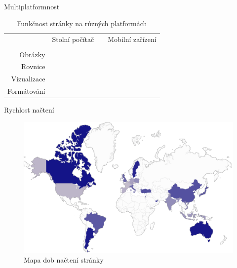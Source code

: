 \documentclass[14pt, hyperref={unicode}]{beamer}
\newcommand{\Firefox}{\faIcon{firefox}}
\newcommand{\Chrome}{\faIcon{chrome}}
\newcommand{\IE}{\faIcon{internet-explorer}}
\newcommand{\Edge}{\faIcon{edge}}
\newcommand{\Safari}{\faIcon{safari}}
\newcommand{\Opera}{\faIcon{opera}}
\newcommand{\Yes}{\faIcon{check}}
\newcommand{\No}{\faIcon{times}}
\newcommand{\NA}{\faIcon{minus}}
\begin{document}
  \begin{frame}{Multiplatformnost}
    \begin{minipage}[b]{\textwidth}
      \begin{table}[H]
        \caption{Funkčnost stránky na různých platformách}
        \scriptsize
        \centering
        \begin{tabular}{@{}rccccccccccccc@{}}
          \toprule
            & \multicolumn{6}{c}{Stolní počítač} & \phantom{abc} & \multicolumn{6}{c}{Mobilní zařízení} \\
          \cmidrule{2-7} \cmidrule{9-14}
            & \Firefox & \Chrome & \IE & \Edge & \Safari & \Opera && \Firefox & \Chrome & \IE & \Edge & \Safari & \Opera \\
          \midrule
            Obrázky     & \Yes & \Yes & \Yes & \Yes & \Yes & \Yes && \Yes & \Yes & \NA & \Yes & \Yes & \Yes \\
            Rovnice     & \Yes & \Yes & \Yes & \Yes & \Yes & \Yes && \Yes & \Yes & \NA & \Yes & \Yes & \Yes \\
            Vizualizace & \Yes & \Yes & \No  & \Yes & \Yes & \Yes && \Yes & \Yes & \NA & \Yes & \Yes & \Yes \\
            Formátování & \Yes & \Yes & \Yes & \Yes & \Yes & \Yes && \Yes & \Yes & \NA & \Yes & \Yes & \Yes \\
          \bottomrule
        \end{tabular}
      \end{table}
    \end{minipage}
  \end{frame}

  \begin{frame}{Rychlost načtení}
    \begin{figure}[H]
      \includegraphics[width=\textwidth,height=0.7\textheight,keepaspectratio]{map.png}
      \caption{Mapa dob načtení stránky}
    \end{figure}
  \end{frame}
\end{document}
